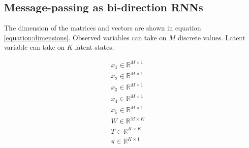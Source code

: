 \documentclass[a4paper,12pt]{article}
\newcommand{\given}{\ | \ }
\newcommand{\msgFtoNCond}[3]{\mu_{f_{#1} \rightarrow #2}(#2 \given #3)}
\begin{document}




\subsection{Message-passing as bi-direction RNNs}

The dimension of the matrices and vectors are shown in equation \ref{equation:dimensions}. 
Observed variables can take on $M$ discrete values. Latent variable can take on $K$ latent states. 

\begin{equation}
\label{equation:dimensions}
\begin{split}
x_{1} \in \mathbb{R}^{M \times 1} \\
x_{2} \in \mathbb{R}^{M \times 1} \\
x_{3} \in \mathbb{R}^{M \times 1} \\
x_{4} \in \mathbb{R}^{M \times 1} \\
x_{5} \in \mathbb{R}^{M \times 1} \\
W \in \mathbb{R}^{M \times K} \\
T \in \mathbb{R}^{K \times K} \\
\pi \in \mathbb{R}^{K \times 1} \\
\end{split}
\end{equation}
\end{document}
